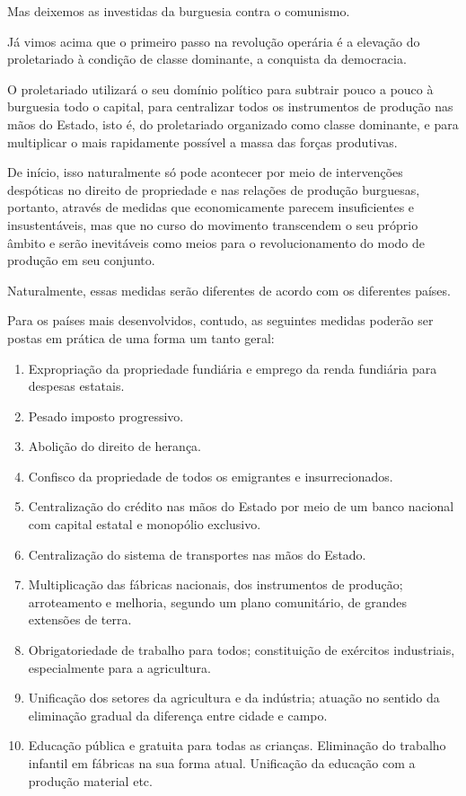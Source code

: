 Mas deixemos as investidas da burguesia contra o comunismo.

Já vimos acima que o primeiro passo na revolução operária é a elevação
do proletariado à condição de classe dominante, a conquista da
democracia.

O proletariado utilizará o seu domínio político para subtrair pouco a
pouco à burguesia todo o capital, para centralizar todos os
instrumentos de produção nas mãos do Estado, isto é, do proletariado
organizado como classe dominante, e para multiplicar o mais rapidamente
possível a massa das forças produtivas.

De início, isso naturalmente só pode acontecer por meio de intervenções
despóticas no direito de propriedade e nas relações de produção
burguesas, portanto, através de medidas que economicamente parecem
insuficientes e insustentáveis, mas que no curso do movimento
transcendem o seu próprio âmbito e serão inevitáveis como meios para o
revolucionamento do modo de produção em seu conjunto.

Naturalmente, essas medidas serão diferentes de acordo com os diferentes
países.

Para os países mais desenvolvidos, contudo, as seguintes medidas poderão
ser postas em prática de uma forma um tanto geral:

\begin{enumerate}
\item Expropriação da propriedade fundiária e emprego da renda fundiária
para despesas \mbox{estatais.} 

\item Pesado imposto progressivo. 

\item Abolição do direito de herança.

\item Confisco da propriedade de todos os emigrantes e insurrecionados. 

\item Centralização do crédito nas mãos do Estado por meio de um banco
nacional com capital estatal e monopólio exclusivo.

\item Centralização do sistema de transportes nas mãos do Estado. 

\item Multiplicação das fábricas nacionais, dos instrumentos de produção;
arroteamento e melhoria, segundo um plano comunitário, de grandes
extensões de terra. 

\item Obrigatoriedade de trabalho para todos; constituição de exércitos
industriais, especialmente para a agricultura. 

\item Unificação dos setores da agricultura e da indústria; atuação no
sentido da eliminação gradual da diferença entre cidade e campo. 

\item Educação pública e gratuita para todas as crianças. Eliminação do
trabalho infantil em fábricas na sua forma atual. Unificação da
educação com a produção material etc.
\end{enumerate}

